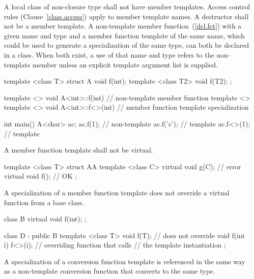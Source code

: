 \pnum
A local class of non-closure type shall not have member templates.
Access control rules (Clause~\ref{class.access})
apply to member template names.
A destructor shall not be a member
template.
A non-template member function~(\ref{dcl.fct}) with a given name
and type and a member function template of the same name, which could be
used to generate a specialization of the same type, can both be
declared in a class.
When both exist, a use of that name and type refers to the
non-template member unless an explicit template argument list is supplied.
\enterexample

\begin{codeblock}
template <class T> struct A {
  void f(int);
  template <class T2> void f(T2);
};

template <> void A<int>::f(int) { }                     // non-template member function
template <> template <> void A<int>::f<>(int) { }       // member function template specialization

int main() {
  A<char> ac;
  ac.f(1);          // non-template
  ac.f('c');        // template
  ac.f<>(1);        // template
}
\end{codeblock}
\exitexample

\pnum
A member function template shall not be virtual.
\enterexample

\begin{codeblock}
template <class T> struct AA {
  template <class C> virtual void g(C);   // error
  virtual void f();                       // OK
};
\end{codeblock}
\exitexample

\pnum
A specialization of
a member function template does not override a virtual function from a
base class.
\enterexample

\begin{codeblock}
class B {
  virtual void f(int);
};

class D : public B {
  template <class T> void f(T); // does not override 
  void f(int i) { f<>(i); }     // overriding function that calls
                                // the template instantiation
};
\end{codeblock}
\exitexample

\pnum
A specialization of a
conversion function template
is referenced in
the same way as a non-template conversion function that converts to
the same type.
\enterexample


